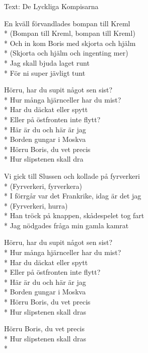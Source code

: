 \begin{SongText}
    \begin{SongInfo}
        Text: De Lyckliga Kompisarna
    \end{SongInfo}
    \begin{SongVerse}
        En kväll förvandlades bompan till Kreml\\*%
        (Bompan till Kreml, bompan till Kreml)\\*%
        Och in kom Boris med skjorta och hjälm\\*%
        (Skjorta och hjälm och ingenting mer)\\*%
        Jag skall bjuda laget runt\\*%
        För ni super jävligt tunt
    \end{SongVerse}
    \begin{SongVerse}
        Hörru, har du supit något sen sist?\\*%
        Hur många hjärnceller har du mist?\\*%
        Har du däckat eller spytt\\*%
        Eller på östfronten inte flytt?\\*%
        Här är du och här är jag\\*%
        Borden gungar i Moskva\\*%
        Hörru Boris, du vet precis\\*%
        Hur slipstenen skall dra
    \end{SongVerse}
    \begin{SongVerse}
        Vi gick till Slussen och kollade på fyrverkeri\\*%
        (Fyrverkeri, fyrverkera)\\*%
        I förrgår var det Frankrike, idag är det jag\\*%
        (Fyrverkeri, hurra)\\*%
        Han tröck på knappen, skådespelet tog fart\\*%
        Jag nödgades fråga min gamla kamrat
    \end{SongVerse}
    \begin{SongVerse}
        Hörru, har du supit något sen sist?\\*%
        Hur många hjärnceller har du mist?\\*%
        Har du däckat eller spytt\\*%
        Eller på östfronten inte flytt?\\*%
        Här är du och här är jag\\*%
        Borden gungar i Moskva\\*%
        Hörru Boris, du vet precis\\*%
        Hur slipstenen skall dras
    \end{SongVerse}
    \begin{SongVerse}
        Hörru Boris, du vet precis\\*%
        Hur slipstenen skall dras\\*%
    \end{SongVerse}
\end{SongText}
\newpage